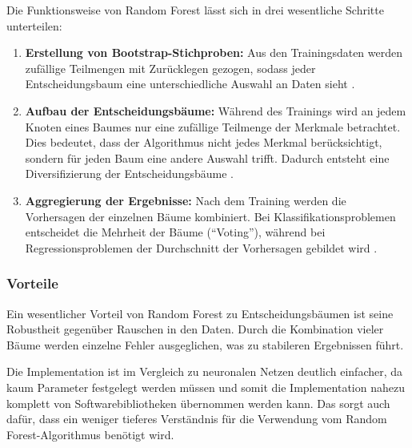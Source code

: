 Die Funktionsweise von Random Forest lässt sich in drei wesentliche Schritte unterteilen:
\begin{enumerate}
    \item \textbf{Erstellung von Bootstrap-Stichproben:}  
    Aus den Trainingsdaten werden zufällige Teilmengen mit Zurücklegen gezogen, sodass jeder Entscheidungsbaum eine unterschiedliche Auswahl an Daten sieht \cite{Efron1979}.
    
    \item \textbf{Aufbau der Entscheidungsbäume:}  
    Während des Trainings wird an jedem Knoten eines Baumes nur eine zufällige Teilmenge der Merkmale betrachtet. Dies bedeutet, dass der Algorithmus nicht jedes Merkmal berücksichtigt, sondern für jeden Baum eine andere Auswahl trifft. Dadurch entsteht eine Diversifizierung der Entscheidungsbäume \cite{Ho1995}.
    
    \item \textbf{Aggregierung der Ergebnisse:}  
    Nach dem Training werden die Vorhersagen der einzelnen Bäume kombiniert. Bei Klassifikationsproblemen entscheidet die Mehrheit der Bäume (\enquote{Voting}), während bei Regressionsproblemen der Durchschnitt der Vorhersagen gebildet wird \cite{Breiman2001}.
\end{enumerate}

\subsubsection{Vorteile}
Ein wesentlicher Vorteil von Random Forest zu Entscheidungsbäumen ist seine Robustheit gegenüber Rauschen in den Daten. Durch die Kombination vieler Bäume werden einzelne Fehler ausgeglichen, was zu stabileren Ergebnissen führt. 

Die Implementation ist im Vergleich zu neuronalen Netzen deutlich einfacher, da kaum Parameter festgelegt werden müssen und somit die Implementation nahezu komplett von Softwarebibliotheken übernommen werden kann. Das sorgt auch dafür, dass ein weniger tieferes Verständnis für die Verwendung vom Random Forest-Algorithmus benötigt wird.





